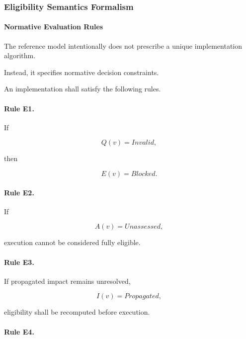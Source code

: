 \documentclass[10pt]{article}
\begin{document}
\subsubsection{Eligibility Semantics Formalism}
\label{appendix:eligibility_semantics}
\paragraph{Normative Evaluation Rules}
\label{appendix:eligibility_rules}

The reference model intentionally does not prescribe a unique implementation
algorithm.

Instead, it specifies normative decision constraints.

An implementation shall satisfy the following rules.

\paragraph{Rule E1.}

If

\[
Q(v)=Invalid,
\]

then

\[
E(v)=Blocked.
\]


\paragraph{Rule E2.}

If

\[
A(v)=Unassessed,
\]

execution cannot be considered fully eligible.


\paragraph{Rule E3.}

If propagated impact remains unresolved,

\[
I(v)=Propagated,
\]

eligibility shall be recomputed before execution.


\paragraph{Rule E4.}
\end{document}

